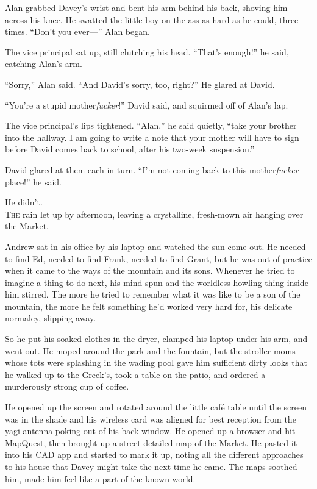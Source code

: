 \documentclass{article}
\begin{document}
Alan grabbed Davey's wrist and bent his arm behind his back, shoving
him across his knee.  He swatted the little boy on the ass as hard as
he could, three times.  ``Don't you ever---'' Alan began.

The vice principal sat up, still clutching his head.  ``That's
enough!'' he said, catching Alan's arm.

``Sorry,'' Alan said.  ``And David's sorry, too, right?'' He glared at
David.

``You're a stupid mother\textit{fucker}!'' David said, and squirmed
off of Alan's lap.

The vice principal's lips tightened.  ``Alan,'' he said quietly,
``take your brother into the hallway.  I am going to write a note that
your mother will have to sign before David comes back to school, after
his two-week suspension.''

David glared at them each in turn.  ``I'm not coming back to this
mother\textit{fucker} place!'' he said.

He didn't.
\\
\lettrine[lines=3, lhang=.5, nindent=0pt, findent=2pt]{T}{he} rain let up by afternoon, leaving a crystalline, fresh-mown air
hanging over the Market.

Andrew sat in his office by his laptop and watched the sun come out. 
He needed to find Ed, needed to find Frank, needed to find Grant, but
he was out of practice when it came to the ways of the mountain and
its sons.  Whenever he tried to imagine a thing to do next, his mind
spun and the worldless howling thing inside him stirred.  The more he
tried to remember what it was like to be a son of the mountain, the
more he felt something he'd worked very hard for, his delicate
normalcy, slipping away.

So he put his soaked clothes in the dryer, clamped his laptop under
his arm, and went out.  He moped around the park and the fountain, but
the stroller moms whose tots were splashing in the wading pool gave
him sufficient dirty looks that he walked up to the Greek's, took a
table on the patio, and ordered a murderously strong cup of coffee.

He opened up the screen and rotated around the little caf\'{e} table
until the screen was in the shade and his wireless card was aligned
for best reception from the yagi antenna poking out of his back
window.  He opened up a browser and hit MapQuest, then brought up a
street-detailed map of the Market.  He pasted it into his CAD app and
started to mark it up, noting all the different approaches to his
house that Davey might take the next time he came.  The maps soothed
him, made him feel like a part of the known world.
\end{document}
